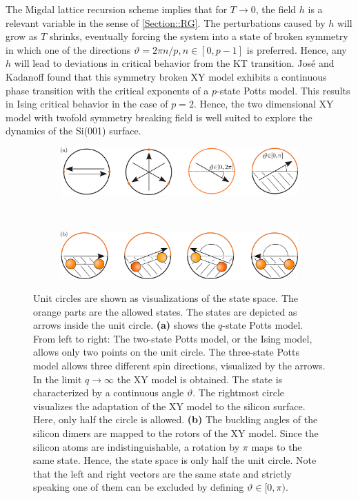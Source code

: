 	The Migdal lattice recursion scheme \cite{migdal1975phase} implies that for $T \rightarrow 0$, the field $h$ is a relevant variable in the sense of \autoref{Section::RG}. The perturbations caused by $h$ will grow as $T$ shrinks, eventually forcing the system into a state of broken symmetry in which one of the directions $\vartheta =	{2 \pi n }/{p}, n \in \left[0, p-1\right]$ is preferred. Hence, any $h$ will lead to deviations in critical behavior from the KT transition. José and Kadanoff \cite{jose1977renormalization} found that this symmetry broken XY model exhibits a continuous phase transition with the critical exponents of a $p$-state Potts model. This results in Ising critical behavior in the case of $p=2$. Hence, the two dimensional XY model with twofold symmetry breaking field is well suited to explore the dynamics of the Si(001) surface.
	\begin{figure}[htp]
		\centering
		\begin{subfigure}{\textwidth}
			\centering
			\includegraphics[width=0.9\linewidth]{graphics/Allowed-States.png}
		\end{subfigure} \\
		\par\bigskip %
		\begin{subfigure}{\textwidth}
			\centering
			\includegraphics[width=0.9\linewidth]{graphics/State-Mapping.png}
		\end{subfigure}
		\caption{Unit circles are shown as visualizations of the state space. The orange parts are the allowed states. The states are depicted as arrows inside the unit circle. \textbf{(a)} shows the $q$-state Potts model. From left to right: The two-state Potts model, or the Ising model, allows only two points on the unit circle.  The three-state Potts model allows three different spin directions, visualized by the arrows. In the limit $q \rightarrow \infty$ the XY model is obtained. The state is characterized by a continuous angle $\vartheta$. The rightmost circle visualizes the adaptation of the XY model to the silicon surface. Here, only half the circle is allowed. \textbf{(b)} The buckling angles of the silicon dimers are mapped to the rotors of the XY model. Since the silicon atoms are indistinguishable, a rotation by $\pi$ maps to the same state. Hence, the state space is only half the unit circle. Note that the left and right vectors are the same state and strictly speaking one of them can be excluded by defining $\vartheta \in [0, \pi)$.}
		\label{Fig::States}
	\end{figure}
